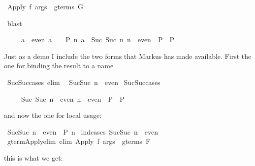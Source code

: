 \begin{isabellebody}
\begin{isamarkuptxt}
\begin{isabelle}
\ Apply\ f\ args\ {\isasymin}\ gterms\ G%
\end{isabelle}%
\end{isamarkuptxt}%
\isamarkuptrue%
\isamarkupfalse%
\ blast\isanewline
{}\isamarkupfalse%
%
\endisatagproof
{\isafoldproof}%
%
\isadelimproof
%
\endisadelimproof
%
\begin{isamarkuptext}%
\begin{isabelle}%
\ \ \ \ \ {\isasymlbrakk}a\ {\isasymin}\ even{\isacharsemicolon}\ a\ {\isacharequal}\ {}\ {\isasymLongrightarrow}\ P{\isacharsemicolon}\ {\isasymAnd}n{\isachardot}\ {\isasymlbrakk}a\ {\isacharequal}\ Suc\ {\isacharparenleft}Suc\ n{\isacharparenright}{\isacharsemicolon}\ n\ {\isasymin}\ even{\isasymrbrakk}\ {\isasymLongrightarrow}\ P{\isasymrbrakk}\ {\isasymLongrightarrow}\ P%
\end{isabelle}

Just as a demo I include
the two forms that Markus has made available. First the one for binding the
result to a name%
\end{isamarkuptext}%
\isamarkuptrue%
\isamarkupfalse%
\ Suc{\isacharunderscore}Suc{\isacharunderscore}cases\ {\isacharbrackleft}elim{\isacharbang}{\isacharbrackright}{\isacharcolon}\isanewline
\ \ {\isachardoublequoteopen}Suc{\isacharparenleft}Suc\ n{\isacharparenright}\ {\isasymin}\ even{\isachardoublequoteclose}\isanewline
\isanewline
{}\isamarkupfalse%
\ Suc{\isacharunderscore}Suc{\isacharunderscore}cases%
\begin{isamarkuptext}%
\begin{isabelle}%
\ \ \ \ \ {\isasymlbrakk}Suc\ {\isacharparenleft}Suc\ n{\isacharparenright}\ {\isasymin}\ even{\isacharsemicolon}\ n\ {\isasymin}\ even\ {\isasymLongrightarrow}\ P{\isasymrbrakk}\ {\isasymLongrightarrow}\ P%
\end{isabelle}

and now the one for local usage:%
\end{isamarkuptext}%
\isamarkuptrue%
\isamarkupfalse%
\ {\isachardoublequoteopen}Suc{\isacharparenleft}Suc\ n{\isacharparenright}\ {\isasymin}\ even\ {\isasymLongrightarrow}\ P\ n{\isachardoublequoteclose}\isanewline
%
\isadelimproof
%
\endisadelimproof
%
\isatagproof
{}\isamarkupfalse%
\ {\isacharparenleft}ind{\isacharunderscore}cases\ {\isachardoublequoteopen}Suc{\isacharparenleft}Suc\ n{\isacharparenright}\ {\isasymin}\ even{\isachardoublequoteclose}{\isacharparenright}\isanewline
{}\isamarkupfalse%
%
\endisatagproof
{\isafoldproof}%
%
\isadelimproof
\isanewline
%
\endisadelimproof
\isanewline
{}\isamarkupfalse%
\ gterm{\isacharunderscore}Apply{\isacharunderscore}elim\ {\isacharbrackleft}elim{\isacharbang}{\isacharbrackright}{\isacharcolon}\ {\isachardoublequoteopen}Apply\ f\ args\ {\isasymin}\ gterms\ F{\isachardoublequoteclose}%
\begin{isamarkuptext}%
this is what we get:


\end{isamarkuptext}
\end{isabellebody}
